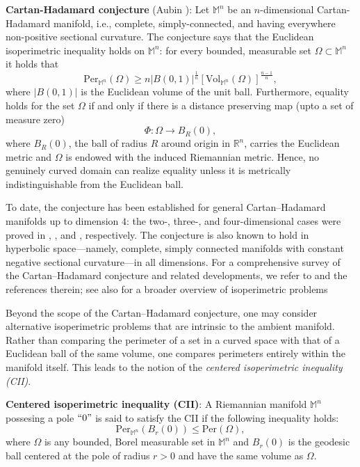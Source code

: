 \documentclass[a4paper,11pt,reqno]{amsart}
\theoremstyle{plain}
\numberwithin{equation}{section} \allowdisplaybreaks
\newcommand{\m}{\mathbb{M}^n}
\newcommand{\rn}{\mathbb{R}^n}
\begin{document}
\medskip



\textbf{Cartan-Hadamard conjecture} (Aubin \cite{Aubin}): Let $\m$ be an $n$-dimensional Cartan-Hadamard manifold, i.e., complete, simply-connected, and having everywhere non-positive sectional curvature. The conjecture says that the Euclidean isoperimetric inequality holds on $\m$: for every bounded, measurable set $\Omega\subset \m$ it holds that
\begin{equation}\label{CH-Cojecture-1}
    \text{Per}_{\m}(\Omega)\geq n|B(0,1)|^{\frac{1}{n}}[\text{Vol}_{\m}(\Omega)]^{\frac{n-1}{n}},
\end{equation}
where $|B(0,1)|$ is the Euclidean volume of the unit ball. Furthermore, equality holds for the set $\Omega$ if and only if there is a distance preserving map (upto a set of measure zero) 
\begin{equation*}
    \Phi: \Omega \to B_{R}(0),
\end{equation*}
where $B_{R}(0)$, the ball of radius $R$ around origin in $\rn$, carries the Euclidean metric and $\Omega$ is endowed with the induced Riemannian metric. Hence, no genuinely curved domain can realize equality unless it is metrically indistinguishable from the Euclidean ball.


\medskip

To date, the conjecture has been established for general Cartan–Hadamard manifolds up to dimension $4$: the two-, three-, and four-dimensional cases were proved in \cite{BR,Weil}, \cite{Kleiner}, and \cite{Croke}, respectively. The conjecture is also known to hold in hyperbolic space—namely, complete, simply connected manifolds with constant negative sectional curvature—in all dimensions. For a comprehensive survey of the Cartan–Hadamard conjecture and related developments, we refer to \cite{KK} and the references therein; see also \cite{Osserman} for a broader overview of isoperimetric problems

Beyond the scope of the Cartan–Hadamard conjecture, one may consider alternative isoperimetric problems that are intrinsic to the ambient manifold. Rather than comparing the perimeter of a set in a curved space with that of a Euclidean ball of the same volume, one compares perimeters entirely within the manifold itself. This leads to the notion of the \textit{centered isoperimetric inequality (CII)}.


\medskip

\textbf{Centered isoperimetric inequality (CII)}: A Riemannian manifold $\m$ possesing a pole $``0"$ is said to satisfy the CII if the following inequality holds:
\begin{equation}\label{Cenetered-2}
    \text{Per}_{\m}(B_r(0))\leq \text{Per}(\Omega),
\end{equation}
where $\Omega$ is any bounded, Borel measurable set in $\m$ and $B_r(0)$ is the geodesic ball centered at the pole of radius $r>0$ and have the same volume as $\Omega$.
\end{document}
